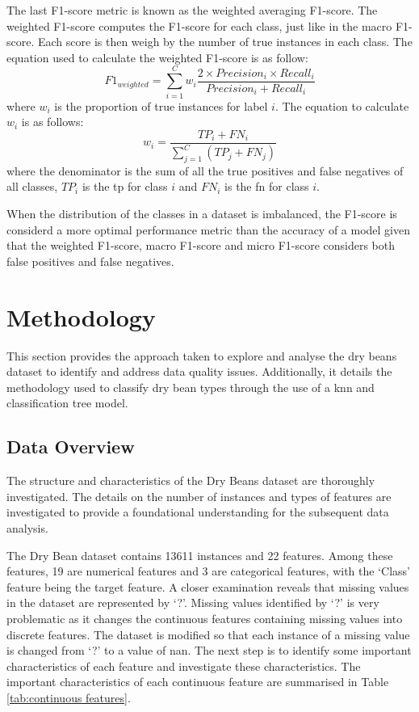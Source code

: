 \documentclass[10pt, conference]{IEEEtran}
\begin{document}
The last F1-score metric is known as the weighted averaging F1-score. The weighted F1-score computes the F1-score
for each class, just like in the macro F1-score. Each score is then weigh by the number of true instances in each class.
The equation used to calculate the weighted F1-score is as follow:
\begin{equation}
    F1_{weighted} = \sum_{i=1}^{C} w_i \frac{2 \times Precision_i \times Recall_i}{Precision_i + Recall_i} \label{weight_F1}
\end{equation}
where $w_i$ is the proportion of true instances for label $i$. The equation to calculate $w_i$ is as follows:
\begin{equation}
    w_i = \frac{TP_i + FN_i}{\sum_{j=1}^{C}(TP_j + FN_j)}    
\end{equation}
where the denominator is the sum of all the true positives and false negatives of all classes, $TP_i$ is the \acrshort{tp}
for class $i$ and $FN_i$ is the \acrshort{fn} for class $i$.

When the distribution of the classes in a dataset is imbalanced, the F1-score is considerd a more optimal performance metric
than the accuracy of a model given that the weighted F1-score, macro F1-score and micro F1-score considers both false positives
and false negatives.

\section{Methodology} \label{section: Methodology}

This section provides the approach taken to explore and analyse the dry beans dataset to identify and address data quality
issues. Additionally, it details the methodology used to classify dry bean types through the use of a \acrshort{knn}
and classification tree model.

\subsection{Data Overview} \label{Data_Overview}

The structure and characteristics of the Dry Beans dataset are thoroughly investigated. The details on the number of instances
and types of features are investigated to provide a foundational understanding for the subsequent data analysis.

The Dry Bean dataset contains 13611 instances and 22 features. Among these features, 19 are numerical features and 3 are
categorical features, with the `Class' feature being the target feature. A closer examination reveals that
missing values in the dataset are represented by `?'. Missing values identified by `?' is very problematic as it changes
the continuous features containing missing values into discrete features. The dataset is modified so that each instance
of a missing value is changed from `?' to a value of \acrfull{nan}. The next step is to identify some important
characteristics of each feature and investigate these characteristics. The important characteristics of each
continuous feature are summarised in Table \ref{tab:continuous features}.
\end{document}

